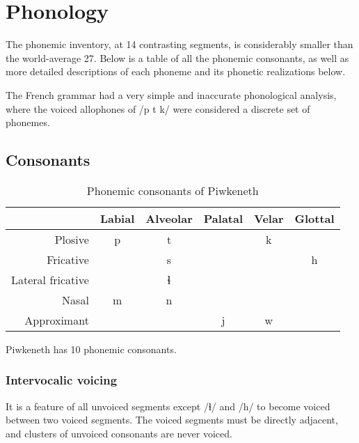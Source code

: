 \documentclass[executivepaper,10pt,twoside,openany,draft]{memoir}
\newcommand{\lang}{Piwkeneth}
\begin{document}
\newpage

\mainmatter

\chapter{Phonology}

The phonemic inventory, at 14 contrasting segments, is considerably smaller than the world-average 27. Below is a table of all the phonemic consonants, as well as more detailed descriptions of each phoneme and its phonetic realizations below.

The French grammar had a very simple and inaccurate phonological analysis, where the voiced allophones of /p t k/ were considered a discrete set of phonemes.

\section{Consonants}

\begin{table}[ht]
    \centering
    \begin{tabular}{rccccc}
        \toprule
        & Labial & Alveolar & Palatal & Velar & Glottal \\
        \midrule
        Plosive & p & t & & k & \\
        Fricative & & s & & & h \\
        Lateral fricative & & ɬ & & & \\
        Nasal & m & n & & & \\
        Approximant & & & j & w & \\
        \bottomrule
    \end{tabular}
    \caption{Phonemic consonants of \lang}
\end{table}


\lang{} has 10 phonemic consonants.


\subsection{Intervocalic voicing} \label{intervocalic}

It is a feature of all unvoiced segments except /ɬ/ and /h/ to become voiced between two voiced segments. The voiced segments must be directly adjacent, and clusters of unvoiced consonants are never voiced.
\end{document}
